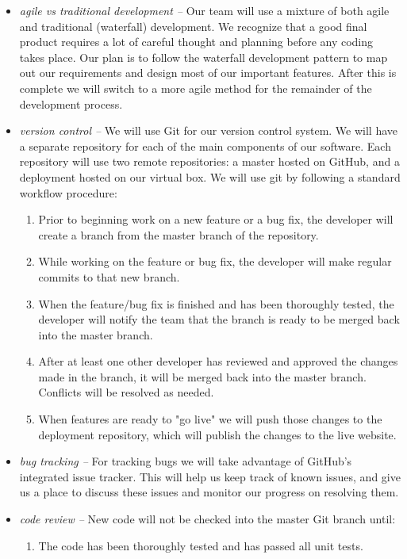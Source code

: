 \documentclass{extarticle}
\begin{document}
\begin{itemize}
\item \emph{agile vs traditional development -- } Our team will use a mixture of both agile and traditional (waterfall)
development. We recognize that a good final product requires a lot of careful thought and planning before any coding
takes place. Our plan is to follow the waterfall development pattern to map out our requirements and design most of
our important features. After this is complete we will switch to a more agile method for the remainder of the
development process.
\item \emph{version control -- }We will use Git for our version control system.  We will have a separate repository
for each of the main components of our software.  Each repository will use two remote repositories: a master hosted
on GitHub, and a deployment hosted on our virtual box.  We will use git by following a standard workflow procedure:
\begin{enumerate}
\item Prior to beginning work on a new feature or a bug fix, the developer will create a branch from the master
branch of the repository.
\item While working on the feature or bug fix, the developer will make regular commits to that new branch.
\item When the feature/bug fix is finished and has been thoroughly tested, the developer will notify the team that
the branch is ready to be merged back into the master branch.
\item After at least one other developer has reviewed and approved the changes made in the branch, it will be
merged back into the master branch.  Conflicts will be resolved as needed.
\item When features are ready to "go live" we will push those changes to the deployment repository, which will
publish the changes to the live website.
\end{enumerate}
\item \emph{bug tracking -- }For tracking bugs we will take advantage of GitHub's integrated issue tracker.  This
will help us keep track of known issues, and give us a place to discuss these issues and monitor our progress on
resolving them.
\item \emph{code review -- } New code will not be checked into the master Git branch until:
\begin{enumerate}
    \item The code has been thoroughly tested and has passed all unit tests.

\end{enumerate}
\end{itemize}
\end{document}
